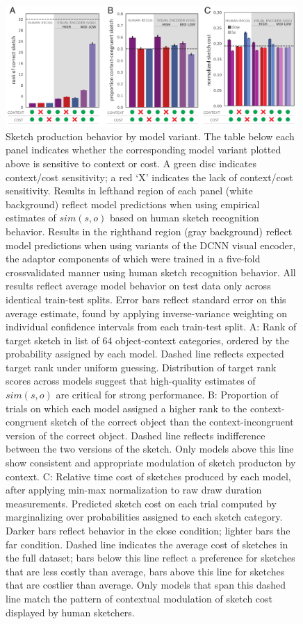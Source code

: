 \documentclass[9pt,twocolumn,twoside]{pnas-new}
\begin{document}
\begin{figure}[htbp]
\centering
\includegraphics[width=0.99\textwidth]{figures/5_model_results_2.pdf}
\caption{Sketch production behavior by model variant. The table below each panel indicates whether the corresponding model variant plotted above is sensitive to context or cost. A green disc indicates context/cost sensitivity; a red `X' indicates the lack of context/cost sensitivity. Results in lefthand region of each panel (white background) reflect model predictions when using empirical estimates of $sim(s,o)$ based on human sketch recognition behavior. Results in the righthand region (gray background) reflect model predictions when using variants of the DCNN visual encoder, the adaptor components of which were trained in a five-fold crossvalidated manner using human sketch recognition behavior. All results reflect average model behavior on test data only across identical train-test splits. Error bars reflect standard error on this average estimate, found by applying inverse-variance weighting on individual confidence intervals from each train-test split. A: Rank of target sketch in list of 64 object-context categories, ordered by the probability assigned by each model. Dashed line reflects expected target rank under uniform guessing. Distribution of target rank scores across models suggest that high-quality estimates of $sim(s,o)$ are critical for strong performance. B: Proportion of trials on which each model assigned a higher rank to the context-congruent sketch of the correct object than the context-incongruent version of the correct object. Dashed line reflects indifference between the two versions of the sketch. Only models above this line show consistent and appropriate modulation of sketch producton by context. C: Relative time cost of sketches produced by each model, after applying min-max normalization to raw draw duration measurements. Predicted sketch cost on each trial computed by marginalizing over probabilities assigned to each sketch category. Darker bars reflect behavior in the close condition; lighter bars the far condition. Dashed line indicates the average cost of sketches in the full dataset; bars below this line reflect a preference for sketches that are less costly than average, bars above this line for sketches that are costlier than average. Only models that span this dashed line match the pattern of contextual modulation of sketch cost displayed by human sketchers.}
\label{model_results}
\end{figure}
\end{document}
